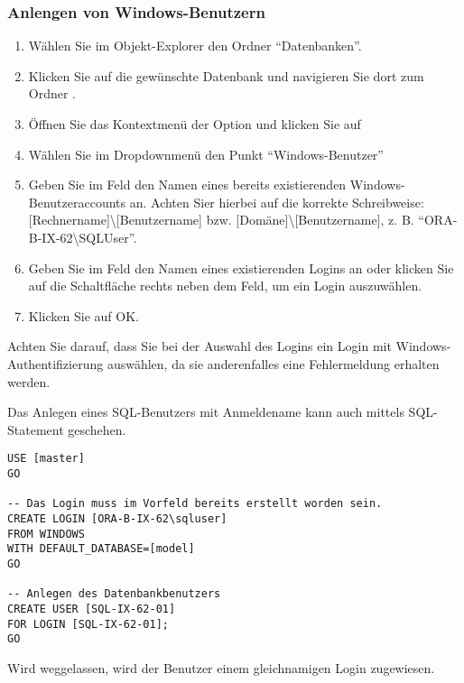           \subsubsection{Anlengen von Windows-Benutzern}
            \begin{enumerate}
              \item Wählen Sie im Objekt-Explorer den Ordner
              \enquote{Datenbanken}.
              \item Klicken Sie auf die gewünschte Datenbank und navigieren
              Sie dort zum Ordner .
              \item Öffnen Sie das Kontextmenü der Option 
              und klicken Sie auf 
              \item Wählen Sie im Dropdownmenü  den Punkt
              \enquote{Windows-Benutzer}
              \item Geben Sie im Feld  den Namen eines
              bereits existierenden Windows-Benutzeraccounts an. Achten Sier
              hierbei auf die korrekte Schreibweise:
              [Rechnername]\textbackslash [Benutzername] bzw.
              [Domäne]\textbackslash [Benutzername], z. B.
              \enquote{ORA-B-IX-62\textbackslash SQLUser}.
              \item Geben Sie im Feld  den Namen eines
              existierenden Logins an oder klicken Sie auf die Schaltfläche
              rechts neben dem Feld, um ein Login auszuwählen.
              \item Klicken Sie auf OK.
            \end{enumerate}
            \begin{merke}
              Achten Sie darauf, dass Sie bei der Auswahl des Logins ein Login
              mit Windows-Authentifizierung auswählen, da sie anderenfalles eine
              Fehlermeldung erhalten werden.
            \end{merke}
            Das Anlegen eines SQL-Benutzers mit Anmeldename kann auch mittels
            SQL-Statement geschehen.
            \begin{lstlisting}[language=ms_sql, caption={Anlegen eines
            Windows-Benutzers}, label=admin19_13]
USE [master]
GO

-- Das Login muss im Vorfeld bereits erstellt worden sein.
CREATE LOGIN [ORA-B-IX-62\sqluser]
FROM WINDOWS 
WITH DEFAULT_DATABASE=[model]
GO

-- Anlegen des Datenbankbenutzers
CREATE USER [SQL-IX-62-01]
FOR LOGIN [SQL-IX-62-01];
GO
            \end{lstlisting}
            \begin{merke}
              Wird  weggelassen, wird der Benutzer einem
              gleichnamigen Login zugewiesen.
            \end{merke}
            \begin{literaturinternet}
              \item \cite{ms173463}
            \end{literaturinternet}
